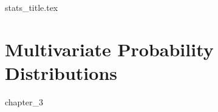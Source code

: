 \documentclass[a4paper,11pt]{book}
\begin{document}
	
	\frontmatter
	{stats_title.tex}
	
	\clearpage
	\thispagestyle{empty}
	
	\tableofcontents
	
	\mainmatter
\chapter{Multivariate Probability Distributions}
	{chapter_3}

	
\end{document}

